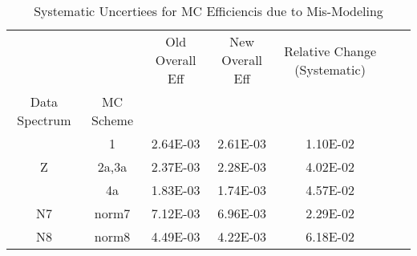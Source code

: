 \begin{table}[h]
\centering
\caption{Systematic Uncertiees for MC Efficiencis due to Mis-Modeling}
\label{tab:mcrw_1}
\begin{tabular}{ccccccc}
\toprule
 &  & Old Overall Eff & New Overall Eff & Relative Change (Systematic) \\
Data Spectrum & MC Scheme &  &  &  \\
\midrule
\multirow[t]{3}{*}{Z} & 1 & 2.64E-03 & 2.61E-03 & 1.10E-02 \\
 & 2a,3a & 2.37E-03 & 2.28E-03 & 4.02E-02 \\
 & 4a & 1.83E-03 & 1.74E-03 & 4.57E-02 \\
N7 & norm7 & 7.12E-03 & 6.96E-03 & 2.29E-02 \\
N8 & norm8 & 4.49E-03 & 4.22E-03 & 6.18E-02 \\
\bottomrule
\end{tabular}
\end{table}
